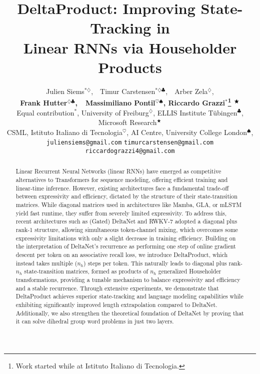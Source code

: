 \documentclass{article} %
\title{DeltaProduct: Improving State-Tracking in\\ Linear RNNs via Householder Products}
\author{Julien Siems$^{*\diamondsuit}$,~~Timur Carstensen$^{*\diamondsuit\clubsuit}$,~~Arber Zela$^{\diamondsuit}$, \\ \textbf{Frank Hutter$^{\diamondsuit \clubsuit}$,~~Massimiliano Pontil$^{\heartsuit\spadesuit}$, Riccardo Grazzi$^{*}$\thanks{Work started while at Istituto Italiano di Tecnologia.}$\hspace{1.4mm}^{\bigstar}$} \\
Equal contribution$^*$, University of Freiburg$^{\diamondsuit}$, ELLIS Institute Tübingen$^{\clubsuit}$, Microsoft Research$^{\bigstar}$ \\CSML, Istituto Italiano di Tecnologia$^{\heartsuit}$, AI Centre, University College London$^{\spadesuit}$, \\
{\small \texttt{juliensiems@gmail.com}}
\quad
{\small \texttt{timurcarstensen@gmail.com}}
\quad
{\small \texttt{riccardograzzi4@gmail.com}}}
\begin{document}
\maketitle

\begin{abstract} 
Linear Recurrent Neural Networks (linear RNNs) have emerged as competitive alternatives to Transformers for sequence modeling, offering efficient training and linear-time inference. However, existing architectures face a fundamental trade-off between expressivity and efficiency, dictated by the structure of their state-transition matrices. While diagonal matrices used in architectures like Mamba, GLA, or mLSTM yield fast runtime, they suffer from severely limited expressivity. To address this, recent architectures such as (Gated) DeltaNet and RWKV-7 adopted a diagonal plus rank-1 structure, allowing simultaneous token-channel mixing, which overcomes some expressivity limitations with only a slight decrease in training efficiency. Building on the interpretation of DeltaNet's recurrence as performing one step of online gradient descent per token on an associative recall loss, we introduce DeltaProduct, which instead takes multiple ($n_h$) steps per token. This naturally leads to diagonal plus rank-$n_h$ state-transition matrices, formed as products of $n_h$ generalized Householder transformations, providing a tunable mechanism to balance expressivity and efficiency and a stable recurrence. Through extensive experiments, we demonstrate that DeltaProduct achieves superior state-tracking and language modeling capabilities while exhibiting significantly improved length extrapolation compared to DeltaNet. Additionally, we also strengthen the theoretical foundation of DeltaNet by proving that it can solve dihedral group word problems in just two layers.

\end{abstract}
\end{document}
